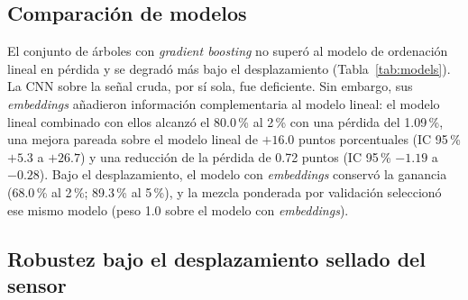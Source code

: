 \documentclass[11pt,a4paper]{article}
\begin{document}
\subsection{Comparación de modelos}

El conjunto de árboles con \emph{gradient boosting} no superó al modelo de
ordenación lineal en pérdida y se degradó más bajo el desplazamiento
(Tabla~\ref{tab:models}). La CNN sobre la señal cruda, por sí sola, fue
deficiente. Sin embargo, sus \emph{embeddings} añadieron información
complementaria al modelo lineal: el modelo lineal combinado con ellos alcanzó el
80.0\,\% al 2\,\% con una pérdida del 1.09\,\%, una mejora pareada sobre el
modelo lineal de $+16.0$ puntos porcentuales (IC 95\,\% $+5.3$ a $+26.7$) y una
reducción de la pérdida de 0.72 puntos (IC 95\,\% $-1.19$ a $-0.28$). Bajo el
desplazamiento, el modelo con \emph{embeddings} conservó la ganancia
(68.0\,\% al 2\,\%; 89.3\,\% al 5\,\%), y la mezcla ponderada por validación
seleccionó ese mismo modelo (peso 1.0 sobre el modelo con \emph{embeddings}).

\begin{table}[htbp]
\centering
\small
\caption{Comparación de modelos con el umbral del 2\,\% (línea base primaria sin
normalización).}
\label{tab:models}
\end{table}

\subsection{Robustez bajo el desplazamiento sellado del sensor}
\end{document}
